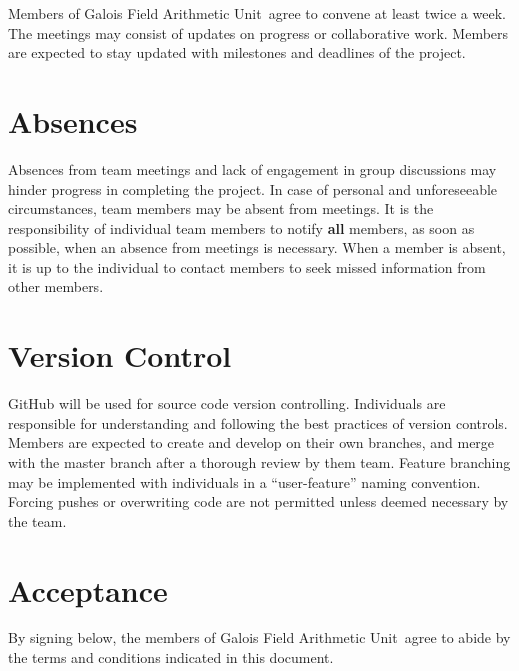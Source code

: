 \documentclass[paper=usletter, fontsize=12pt]{article}
\newcommand{\team}{Galois Field Arithmetic Unit}
\begin{document}
        Members of \team \ agree to convene at least twice a week. The meetings may consist of updates on progress or collaborative work. Members are expected to stay updated with milestones and deadlines of the project.

    \section{Absences}

        Absences from team meetings and lack of engagement in group discussions may hinder progress in completing the project. In case of personal and unforeseeable circumstances, team members may be absent from meetings. It is the responsibility of individual team members to notify \textbf{all} members, as soon as possible, when an absence from meetings is necessary. When a member is absent, it is up to the individual to contact members to seek missed information from other members.

    \section{Version Control}

        GitHub will be used for source code version controlling. Individuals are responsible for understanding and following the best practices of version controls. Members are expected to create and develop on their own branches, and merge with the master branch after a thorough review by them team. Feature branching may be implemented with individuals in a “user-feature” naming convention. Forcing pushes or overwriting code are not permitted unless deemed necessary by the team.

    \section{Acceptance}

    By signing below, the members of \team \ agree to abide by the terms and conditions indicated in this document. \\
\end{document}
